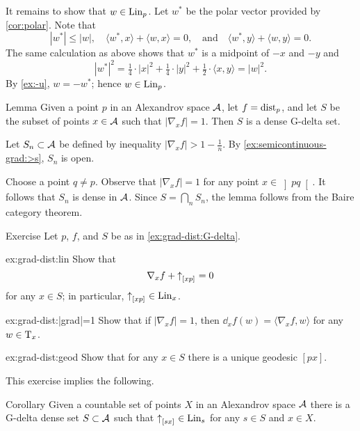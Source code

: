 It remains to show that $w\in\mathop{\rm Lin}\nolimits_p$.
Let $w^*$ be the polar vector provided by \ref{cor:polar}.
Note that 
\[|w^*|\le |w|,
\quad
\langle w^*,x\rangle+\langle w,x\rangle=0,
\quad\text{and}\quad
\langle w^*,y\rangle+\langle w,y\rangle=0.
\]
The same calculation as above shows that $w^*$ is a midpoint of $-x$ and $-y$ and 
\[|w^*|^2= \tfrac14\cdot |x|^2+\tfrac14\cdot|y|^2+\tfrac12\cdot\langle x,y\rangle=|w|^2.\]
By \ref{ex:-u}, $w=-w^*$;
hence $w\in\mathop{\rm Lin}\nolimits_p$.
\qeds

\begin{thm}{Lemma}\label{ex:grad-dist:G-delta}
Given a point $p$ in an Alexandrov space $\mathcal{A}$,
let $f=\mathrm{dist}_p$, and let $S$ be the subset of points $x\in\mathcal{A}$ such that $|\nabla_xf|=1$.
Then $S$ is a dense G-delta set.

\end{thm}

Let $S_n\subset \mathcal{A}$ be defined by inequality $|\nabla_xf|>1-\tfrac1n$.
By \ref{ex:semicontinuous-grad:>s}, $S_n$ is open.

Choose a point $q\ne p$.
Observe that $|\nabla_xf|=1$ for any point $x\in\left]pq\right[$.
It follows that $S_n$ is dense in $\mathcal{A}$.
Since $S=\bigcap_nS_n$, the lemma follows from the Baire category theorem.
\qeds


\begin{thm}{Exercise}\label{ex:grad-dist}
Let $p$, $f$, and $S$ be as in \ref{ex:grad-dist:G-delta}.

\begin{subthm}{ex:grad-dist:lin}
Show that 
\[\nabla_xf+{\uparrow}_{[{x}{p}]_{{}}}=0\]
for any 
$x\in S$;
in particular, ${\uparrow}_{[{x}{p}]_{{}}}\in \mathop{\rm Lin}\nolimits_x$.
\end{subthm}

\begin{subthm}{ex:grad-dist:|grad|=1}
Show that if $|\nabla_xf|=1$, then $\dd_xf(w)= \langle\nabla_xf,w\rangle$ for any $w\in \mathrm{T}_x$.
\end{subthm}

\begin{subthm}{ex:grad-dist:geod}
Show that for any $x\in S$ there is a unique geodesic $[px]$.
\end{subthm}

\end{thm}

This exercise implies the following.

\begin{thm}{Corollary}\label{cor:euclid-subcone}
Given a countable set of points $X$ in an Alexandrov space $\mathcal{A}$
there is a G-delta dense set $S\subset\mathcal{A}$
such that 
${\uparrow}_{[{s}{x}]_{{}}}\in \mathop{\rm Lin}\nolimits_s$
for any $s\in S$ and $x\in X$.
\end{thm}

